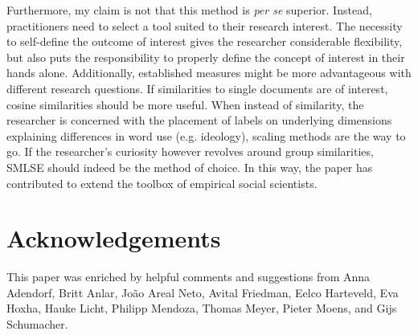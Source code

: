 \documentclass{article}
\begin{document}
Furthermore, my claim is not that this method is \textit{per se} superior. Instead, practitioners need to select a tool suited to their research interest. The necessity to self-define the outcome of interest gives the researcher considerable flexibility, but also puts the responsibility to properly define the concept of interest in their hands alone. Additionally, established measures might be more advantageous with different research questions. If similarities to single documents are of interest, cosine similarities should be more useful. When instead of similarity, the researcher is concerned with the placement of labels on underlying dimensions explaining differences in word use (e.g. ideology), scaling methods are the way to go. If the researcher's curiosity however revolves around group similarities, SMLSE should indeed be the method of choice. In this way, the paper has contributed to extend the toolbox of empirical social scientists. \par



\section*{Acknowledgements}

This paper was enriched by helpful comments and suggestions from Anna Adendorf, Britt Anlar, João Areal Neto, Avital Friedman, Eelco Harteveld, Eva Hoxha, Hauke Licht, Philipp Mendoza, Thomas Meyer, Pieter Moens, and Gijs Schumacher.



\printbibliography

\newpage

% 
% 
\end{document}
